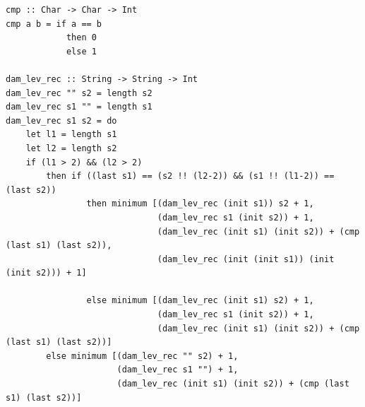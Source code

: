 \documentclass[12pt]{report}
\begin{document}
\begin{lstlisting}[label=some-code,caption=Функция нахождения расстояния Дамерау-Левенштейна рекурсивно]
cmp :: Char -> Char -> Int
cmp a b = if a == b
            then 0
            else 1

dam_lev_rec :: String -> String -> Int
dam_lev_rec "" s2 = length s2
dam_lev_rec s1 "" = length s1
dam_lev_rec s1 s2 = do
    let l1 = length s1
    let l2 = length s2
    if (l1 > 2) && (l2 > 2)
        then if ((last s1) == (s2 !! (l2-2)) && (s1 !! (l1-2)) == (last s2))
                then minimum [(dam_lev_rec (init s1)) s2 + 1, 
                              (dam_lev_rec s1 (init s2)) + 1,
                              (dam_lev_rec (init s1) (init s2)) + (cmp (last s1) (last s2)),
                              (dam_lev_rec (init (init s1)) (init (init s2))) + 1]
                              
                else minimum [(dam_lev_rec (init s1) s2) + 1, 
                              (dam_lev_rec s1 (init s2)) + 1,
                              (dam_lev_rec (init s1) (init s2)) + (cmp (last s1) (last s2))]
        else minimum [(dam_lev_rec "" s2) + 1, 
                      (dam_lev_rec s1 "") + 1,
                      (dam_lev_rec (init s1) (init s2)) + (cmp (last s1) (last s2))]
\end{lstlisting}
\end{document}
